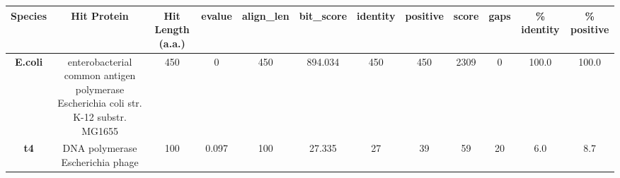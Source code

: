 \begin{tabular}{|c|c|c|c|c|c|c|c|c|c|c|c|} \hline
\textbf{Species} & \textbf{Hit Protein} & \textbf{Hit Length (a.a.)} & \textbf{evalue} & \textbf{align\_len} & \textbf{bit\_score} & \textbf{identity} & \textbf{positive} & \textbf{score} & \textbf{gaps} & \textbf{\% identity} & \textbf{\% positive} \\ \hline
\textbf{E.coli} & enterobacterial common antigen polymerase Escherichia coli str. K-12 substr. MG1655 & 450 & 0 & 450 & 894.034 & 450 & 450 & 2309 & 0 & 100.0 & 100.0\\
\textbf{t4} & DNA polymerase Escherichia phage  & 100 & 0.097 & 100 & 27.335 & 27 & 39 & 59 & 20 & 6.0 & 8.7\\
\hline \end{tabular}
